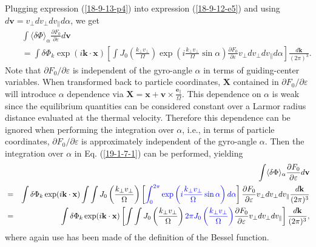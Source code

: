 \documentclass{llncs}
\newcommand{\tmcolor}[2]{{\color{#1}{#2}}}
\begin{document}
Plugging expression (\ref{18-9-13-p4}) into expression (\ref{18-9-12-e5}) and
using $d\mathbf{v}= v_{\perp} d v_{\perp} d v_{\parallel} d \alpha$, we get
\begin{eqnarray}
  &  & \int \langle \delta \Phi \rangle_{\alpha} \frac{\partial F_0}{\partial
  \varepsilon} d\mathbf{v} \nonumber\\
  &  & = \int \delta \Phi_k \exp (i\mathbf{k} \cdot \mathbf{x}) \left[ \int
  J_0 \left( \frac{k_{\perp} v_{\perp}}{\Omega} \right) \exp \left( i
  \frac{k_{\perp} v_{\perp}}{\Omega} \sin \alpha \right) \frac{\partial
  F_0}{\partial \varepsilon} v_{\perp} d v_{\perp} d v_{\parallel} d \alpha
  \right] \frac{d\mathbf{k}}{(2 \pi)^3} .  \label{19-1-7-1}
\end{eqnarray}
Note that $\partial F_0 / \partial \varepsilon$ is independent of the
gyro-angle $\alpha$ in terms of guiding-center variables. When transformed
back to particle coordinates, $\mathbf{X}$ contained in $\partial F_0 /
\partial \varepsilon$ will introduce $\alpha$ dependence via
$\mathbf{X}=\mathbf{x}+\mathbf{v} \times
\frac{\mathbf{e}_{\parallel}}{\Omega}$. This dependence on $\alpha$ is weak
since the equilibrium quantities can be considered constant over a Larmor
radius distance evaluated at the thermal velocity. Therefore this dependence
can be ignored when performing the integration over $\alpha$, i.e., in terms
of particle coordinates, $\partial F_0 / \partial \varepsilon$ is
approximately independent of the gyro-angle $\alpha$. Then the integration
over $\alpha$ in Eq. (\ref{19-1-7-1}) can be performed, yielding
\begin{eqnarray}
  &  & \int \langle \delta \Phi \rangle_{\alpha} \frac{\partial F_0}{\partial
  \varepsilon} d\mathbf{v} \nonumber\\
  & = & \int \delta \Phi_k \exp (i\mathbf{k} \cdot \mathbf{x}) \int \int J_0
  \left( \frac{k_{\perp} v_{\perp}}{\Omega} \right) \left[
  \tmcolor{blue}{\int_0^{2 \pi} \exp \left( i \frac{k_{\perp}
  v_{\perp}}{\Omega} \sin \alpha \right) d \alpha} \right] \frac{\partial
  F_0}{\partial \varepsilon} v_{\perp} d v_{\perp} d v_{\parallel}
  \frac{d\mathbf{k}}{(2 \pi)^3} \nonumber\\
  & = & \int \delta \Phi_k \exp (i\mathbf{k} \cdot \mathbf{x}) \left[ \int
  \int J_0 \left( \frac{k_{\perp} v_{\perp}}{\Omega} \right) \tmcolor{blue}{2
  \pi J_0 \left( \frac{k_{\perp} v_{\perp}}{\Omega} \right)} \frac{\partial
  F_0}{\partial \varepsilon} v_{\perp} d v_{\perp} d v_{\parallel} \right]
  \frac{d\mathbf{k}}{(2 \pi)^3},  \label{18-9-13-a4}
\end{eqnarray}
where again use has been made of the definition of the Bessel function.
\end{document}
